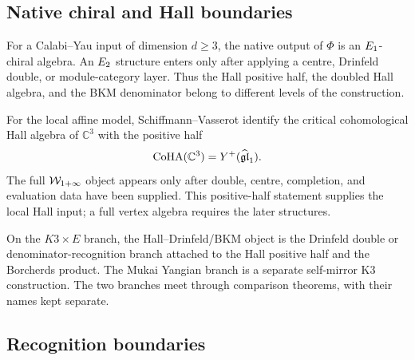 \subsection*{Native chiral and Hall boundaries}

For a Calabi--Yau input of dimension $d\geq3$, the native output of
$\Phi$ is an $E_1$-chiral algebra.  An $E_2$ structure enters only
after applying a centre, Drinfeld double, or module-category layer.  Thus
the Hall positive half, the doubled Hall algebra, and the BKM denominator
belong to different levels of the construction.

For the local affine model, Schiffmann--Vasserot identify the critical
cohomological Hall algebra of $\mathbb C^3$ with the positive half
\[
  \mathrm{CoHA}(\mathbb C^3)=Y^+(\widehat{\mathfrak{gl}}_1).
\]
The full $\mathcal W_{1+\infty}$ object appears only after double, centre,
completion, and evaluation data have been supplied.  This positive-half
statement supplies the local Hall input; a full vertex algebra requires
the later structures.

On the $K3\times E$ branch, the Hall--Drinfeld/BKM object is the
Drinfeld double or denominator-recognition branch attached to the Hall
positive half and the Borcherds product.  The Mukai Yangian branch is a
separate self-mirror K3 construction.  The two branches meet through
comparison theorems, with their names kept separate.

\subsection*{Recognition boundaries}

